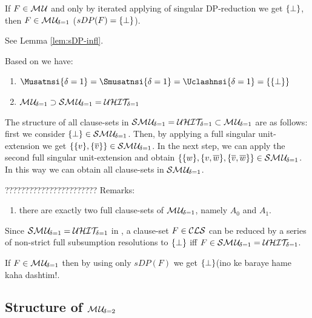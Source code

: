 \documentclass{report}
\begin{document}
\begin{lem}\label{lem:mu1-sdp}
If $F \in \mathcal{M\hspace{0.8pt}U}$ and only by iterated applying of singular DP-reduction we get $\{ \bot \}$, then $F \in \mathcal{M\hspace{0.8pt}U}_{\!\delta=1}$ ($sDP(F) =\{ \bot \}$).
\end{lem}
\begin{prf}
See Lemma \ref{lem:sDP-infl}.
\end{prf}

\begin{lem}\label{lem:mu1-sma-uhit}
Based on \cite{h9} we have:
  \begin{enumerate}
  \item $\Musatnsi{\delta=1} = \Smusatnsi{\delta=1} = \Uclashnsi{\delta=1} = \set{\set{\bot}}$ 
  \item $\mathcal{M\hspace{0.8pt}U}_{\!\delta=1} \supset \mathcal{S}\mathcal{M\hspace{0.8pt}U}_{\!\delta=1} = \mathcal{U}\mathcal{HIT}_{\!\!\delta=1}$
  \end{enumerate} 
\end{lem}

\begin{lem}\label{lem:mu1-strc}
The structure of all clause-sets in $ \mathcal{S}\mathcal{M\hspace{0.8pt}U}_{\!\delta=1} = \mathcal{U}\mathcal{HIT}_{\!\!\delta=1} \subset \mathcal{M\hspace{0.8pt}U}_{\!\delta=1}$ are as follows: first we consider $\{ \bot \} \in \mathcal{S}\mathcal{M\hspace{0.8pt}U}_{\!\delta=1}$. Then, by applying a full singular unit-extension we get $\{ \{ v \},\{ \overline{v} \} \} \in \mathcal{S}\mathcal{M\hspace{0.8pt}U}_{\!\delta=1}$. In the next step, we can apply the second full singular unit-extension and obtain $\{ \{ w \},\{ v,\overline{w} \},\{ \overline{v},\overline{w} \} \}\in \mathcal{S}\mathcal{M\hspace{0.8pt}U}_{\!\delta=1}$. In this way we can obtain all clause-sets in $\mathcal{S}\mathcal{M\hspace{0.8pt}U}_{\!\delta=1}$.
\end{lem}

???????????????????????
Remarks: 
  \begin{enumerate}
  \item there are exactly two full clause-sets of $\mathcal{M\hspace{0.8pt}U}_{\!\delta=1}$, namely $A_0$ and $A_1$.
  \end{enumerate} 

Since $\mathcal{S}\mathcal{M\hspace{0.8pt}U}_{\!\delta=1} = \mathcal{U}\mathcal{HIT}_{\!\!\delta=1}$ in \cite{h9}, a clause-set $F \in \mathcal{CLS}$ can be reduced by a series of non-strict full subsumption resolutions to $\{ \bot \}$ iff $F \in \mathcal{S}\mathcal{M\hspace{0.8pt}U}_{\!\delta=1} = \mathcal{U}\mathcal{HIT}_{\!\!\delta=1}$.


If $F \in \mathcal{M\hspace{0.8pt}U}_{\!\delta=1}$ then  by using only $sDP(F)$ we get $\{ \bot \}$(ino ke baraye hame kaha dashtim!.

\subsection{Structure of $\mathcal{M\hspace{0.8pt}U}_{\!\delta=2}$}
\label{sec:smu2}
\end{document}
